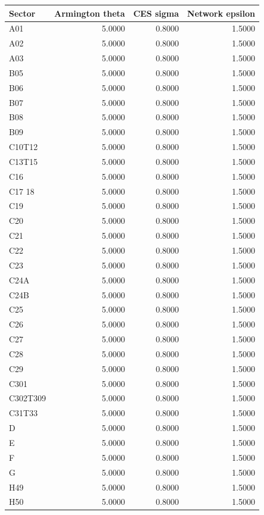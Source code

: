 \begin{tabular}{lrrr}
\toprule
Sector & Armington theta & CES sigma & Network epsilon \\
\midrule
A01 & 5.0000 & 0.8000 & 1.5000 \\
A02 & 5.0000 & 0.8000 & 1.5000 \\
A03 & 5.0000 & 0.8000 & 1.5000 \\
B05 & 5.0000 & 0.8000 & 1.5000 \\
B06 & 5.0000 & 0.8000 & 1.5000 \\
B07 & 5.0000 & 0.8000 & 1.5000 \\
B08 & 5.0000 & 0.8000 & 1.5000 \\
B09 & 5.0000 & 0.8000 & 1.5000 \\
C10T12 & 5.0000 & 0.8000 & 1.5000 \\
C13T15 & 5.0000 & 0.8000 & 1.5000 \\
C16 & 5.0000 & 0.8000 & 1.5000 \\
C17 18 & 5.0000 & 0.8000 & 1.5000 \\
C19 & 5.0000 & 0.8000 & 1.5000 \\
C20 & 5.0000 & 0.8000 & 1.5000 \\
C21 & 5.0000 & 0.8000 & 1.5000 \\
C22 & 5.0000 & 0.8000 & 1.5000 \\
C23 & 5.0000 & 0.8000 & 1.5000 \\
C24A & 5.0000 & 0.8000 & 1.5000 \\
C24B & 5.0000 & 0.8000 & 1.5000 \\
C25 & 5.0000 & 0.8000 & 1.5000 \\
C26 & 5.0000 & 0.8000 & 1.5000 \\
C27 & 5.0000 & 0.8000 & 1.5000 \\
C28 & 5.0000 & 0.8000 & 1.5000 \\
C29 & 5.0000 & 0.8000 & 1.5000 \\
C301 & 5.0000 & 0.8000 & 1.5000 \\
C302T309 & 5.0000 & 0.8000 & 1.5000 \\
C31T33 & 5.0000 & 0.8000 & 1.5000 \\
D & 5.0000 & 0.8000 & 1.5000 \\
E & 5.0000 & 0.8000 & 1.5000 \\
F & 5.0000 & 0.8000 & 1.5000 \\
G & 5.0000 & 0.8000 & 1.5000 \\
H49 & 5.0000 & 0.8000 & 1.5000 \\
H50 & 5.0000 & 0.8000 & 1.5000 \\

\end{tabular}
